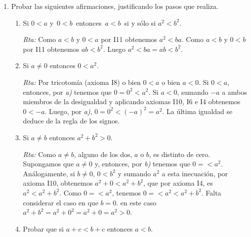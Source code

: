 \documentclass[12pt,spanish,makeidx]{amsbook}
\newcommand{\rta}{\noindent\textit{Rta: }}
\begin{document}
\begin{enumerate}
\begin{enumerate}
			\item $a<b\,$ y $\,c<0$ implican $\,b\cdot c<a\cdot c$
			
			\rta Sumamos $-c$  a la inecuación  $\,c<0$ y  obtenemos, por axioma I10,    $-c + c<-c + 0$, luego por axioma I6 en la parte izquierda y axioma I4 en la parte derecha, obtenemos $0 < -c$: Ahora bien  por axioma I11, $a<b\,$ y  $0 < -c$ implican $a \cdot (-c)<b \cdot (-c)$. Por la regla de los signos tenemos $-a \cdot c<- b \cdot c$. Sumando $a \cdot c$ y $ b \cdot c$  a ambos lados de la inecuación y aplicando axioma I10 y  repetidamente los axiomas I4 e I6, obtenemos  $\,b\cdot c<a\cdot c$.
		\end{enumerate}
		\medskip
		
		\item  Probar las siguientes afirmaciones, justificando los pasos que realiza.
		\begin{enumerate}
			\item Si $0 < a$  y $\,0<b\,$ entonces $\,a<b\,$ si y sólo si $a^2<b^2$.
			
			\rta  Como $a < b$ y $0 < a$ por I11 obtenemos $a^2 < ba$. Como $a < b$ y $0 < b$ por I11 obtenemos $ab < b^2$. Luego  $a^2 < ba = ab < b^2$.
			
			
			\item Si $a\neq 0$  entonces $0 < a^2$.
			
			\rta  Por tricotomía (axioma I8) o bien $0 <a$ o bien $a <0$. Si $0<a$, entonces, por \textit{a)} tenemos que $0 = 0^2 < a^2$.  Si $a<0$, sumando $-a$ a ambos miembros de la desigualdad y aplicando axiomas I10, I6 e I4 obtenemos $0 < -a$. Luego, por \textit{a)},  $0 = 0^2 < (-a)^2 = a^2$. La última igualdad se deduce de la regla de los signos. 
			
			\item Si $a\neq b$  entonces $a^2+b^2>0$.
			
			\rta Como $a\neq b$,  alguno de los dos, $a$ o $b$, es distinto de cero. Supongamos que $a \ne 0$ y, entonces, por  \textit{b)} tenemos que $0 = < a^2$. Análogamente, si $b \ne 0$, $0 < b^2$ y sumando  $a^2$  a esta inecuación, por axioma I10, obtenemos $a^2 + 0 <a^2 + b^2$, que por axioma I4, es $a^2  <a^2 + b^2$. Como $0 = < a^2$, tenemos $0 = < a^2 < a^2 + b^2$. Falta considerar el caso en que  $b =0$. en este caso $a^2 + b^2 = a^2 + 0^2 = a^2 + 0 = a^2 > 0$.
			
			
			
			
			\item Probar que si $a+c <b+c$ entonces $a<b$.
			

\end{enumerate}
\end{enumerate}
\end{document}
